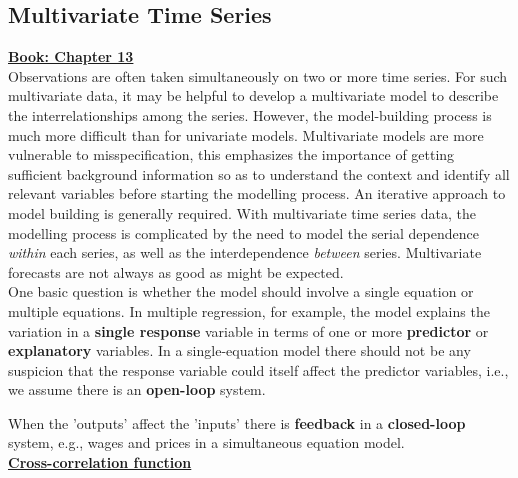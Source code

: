 \subsection{Multivariate Time Series}


\textbf{\underline{Book: Chapter 13}}\\

Observations are often taken simultaneously on two or more time series. For such multivariate data, it may be helpful to develop a multivariate model to describe the interrelationships among the series. However, the model-building process is much more difficult than for univariate models. Multivariate models are more vulnerable to misspecification, this emphasizes the importance of getting sufficient background information so as to understand the context and identify all relevant variables before starting the modelling process. An iterative approach to model building is generally required. With multivariate time series data, the modelling process is complicated by the need to model the serial dependence \textit{within} each series, as well as the interdependence \textit{between} series. Multivariate forecasts are not always as good as might be expected.\\

One basic question is whether the model should involve a single equation or multiple equations. In multiple regression, for example, the model explains the variation in a \textbf{single response} variable in terms of one or more \textbf{predictor} or \textbf{explanatory} variables. In a single-equation model there should not be any suspicion that the response variable could itself affect the predictor variables, i.e., we assume there is an \textbf{open-loop} system. \

When the 'outputs' affect the 'inputs' there is \textbf{feedback} in a \textbf{closed-loop} system, e.g., wages and prices in a simultaneous equation model. \\


\textbf{\underline{Cross-correlation function}}\\

